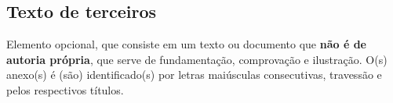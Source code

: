 \begin{anexosenv}
\chapter{Texto de terceiros}

Elemento opcional, que consiste em um texto ou documento que \textbf{não é de autoria própria}, que serve de fundamentação, comprovação e ilustração. O(s) anexo(s) é (são) identificado(s) por letras maiúsculas consecutivas, travessão e pelos respectivos títulos.

\end{anexosenv}